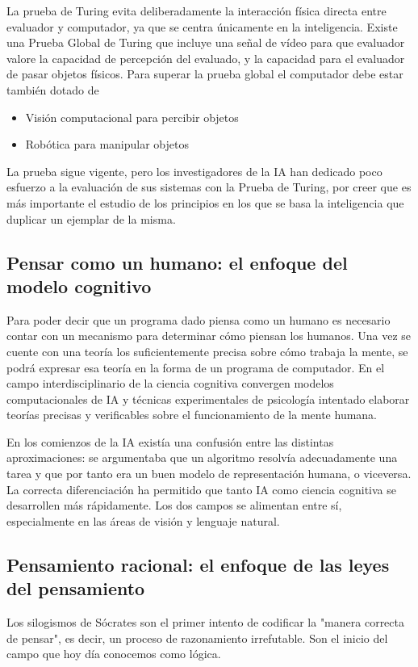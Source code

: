 \documentclass[12pt,a4paper]{article}
\begin{document}
La prueba de Turing evita deliberadamente la interacción física directa entre evaluador y computador, ya que se centra únicamente en la inteligencia. Existe una Prueba Global de Turing que incluye una señal de vídeo para que evaluador valore la capacidad de percepción del evaluado, y la capacidad para el evaluador de pasar objetos físicos. Para superar la prueba global el computador debe estar también dotado de

\begin{itemize}
\item Visión computacional para percibir objetos
\item Robótica para manipular objetos
\end{itemize}

La prueba sigue vigente, pero los investigadores de la IA han dedicado poco esfuerzo a la evaluación de sus sistemas con la Prueba de Turing, por creer que es más importante el estudio de los principios en los que se basa la inteligencia que duplicar un ejemplar de la misma.

\subsection{Pensar como un humano: el enfoque del modelo cognitivo}
Para poder decir que un programa dado piensa como un humano es necesario contar con un mecanismo para determinar cómo piensan los humanos. Una vez se cuente con una teoría los suficientemente precisa sobre cómo trabaja la mente, se podrá expresar esa teoría en la forma de un programa de computador. En el campo interdisciplinario de la ciencia cognitiva convergen modelos computacionales de IA y técnicas experimentales de psicología intentado elaborar teorías precisas y verificables sobre el funcionamiento de la mente humana.

En los comienzos de la IA existía una confusión entre las distintas aproximaciones: se argumentaba que un algoritmo resolvía adecuadamente una tarea y que por tanto era un buen modelo de representación humana, o viceversa. La correcta diferenciación ha permitido que tanto IA como ciencia cognitiva se desarrollen más rápidamente. Los dos campos se alimentan entre sí, especialmente en las áreas de visión y lenguaje natural.

\subsection{Pensamiento racional: el enfoque de las leyes del pensamiento}
Los silogismos de Sócrates son el primer intento de codificar la "manera correcta de pensar", es decir, un proceso de razonamiento irrefutable. Son el inicio del campo que hoy día conocemos como lógica.
\end{document}
